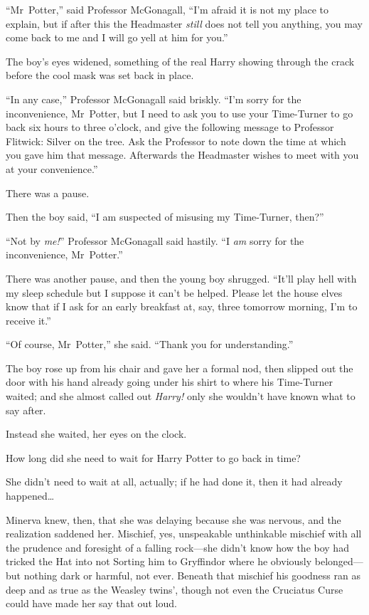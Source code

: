 “Mr~Potter,” said Professor McGonagall, “I’m afraid it is not my place to explain, but if after this the Headmaster \emph{still} does not tell you anything, you may come back to me and I will go yell at him for you.”

The boy’s eyes widened, something of the real Harry showing through the crack before the cool mask was set back in place.

“In any case,” Professor McGonagall said briskly. “I’m sorry for the inconvenience, Mr~Potter, but I need to ask you to use your Time-Turner to go back six hours to three o’clock, and give the following message to Professor Flitwick: Silver on the tree. Ask the Professor to note down the time at which you gave him that message. Afterwards the Headmaster wishes to meet with you at your convenience.”

There was a pause.

Then the boy said, “I am suspected of misusing my Time-Turner, then?”

“Not by \emph{me!}” Professor McGonagall said hastily. “I \emph{am} sorry for the inconvenience, Mr~Potter.”

There was another pause, and then the young boy shrugged. “It’ll play hell with my sleep schedule but I suppose it can’t be helped. Please let the house elves know that if I ask for an early breakfast at, say, three \AM tomorrow morning, I’m to receive it.”

“Of course, Mr~Potter,” she said. “Thank you for understanding.”

The boy rose up from his chair and gave her a formal nod, then slipped out the door with his hand already going under his shirt to where his Time-Turner waited; and she almost called out \emph{Harry!} only she wouldn’t have known what to say after.

Instead she waited, her eyes on the clock.

How long did she need to wait for Harry Potter to go back in time?

She didn’t need to wait at all, actually; if he had done it, then it had already happened…

Minerva knew, then, that she was delaying because she was nervous, and the realization saddened her. Mischief, yes, unspeakable unthinkable mischief with all the prudence and foresight of a falling rock—she didn’t know how the boy had tricked the Hat into not Sorting him to Gryffindor where he obviously belonged—but nothing dark or harmful, not ever. Beneath that mischief his goodness ran as deep and as true as the Weasley twins’, though not even the Cruciatus Curse could have made her say that out loud.

